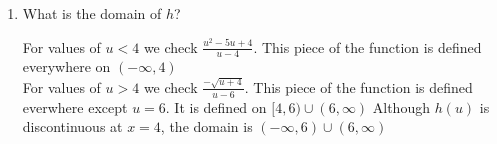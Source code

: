 \documentclass[nooutcomes, handout]{ximera}
\begin{document}
\begin{problem}
\begin{enumerate}
\begin{freeResponse}
	\end{freeResponse}

	\item What is the domain of $h$?

	\begin{freeResponse}
	For values of $u<4$ we check $\frac{u^2-5u+4}{u - 4}$.  This piece of the function is defined everywhere on $(-\infty,4)$\\
	For values of $u>4$ we check $\frac{-\sqrt{u+4}}{u - 6}$. This piece of the function is defined everwhere except $u=6$.  It is defined on $[4,6)\cup(6,\infty)$
	Although $h(u)$ is discontinuous at $x=4$, the domain is $(-\infty,6)\cup(6,\infty)$
	

	\end{freeResponse}


\end{enumerate}
\end{problem}
								
\end{document}
